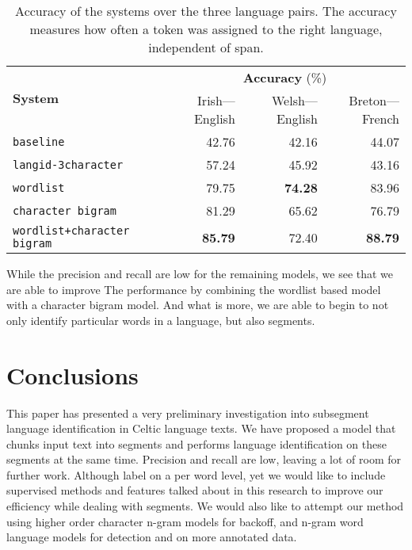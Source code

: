 \documentclass[11pt]{article}
\begin{document}
\begin{table}
\begin{center}
\begin{tabular}{|l|r|r|r|}
\hline
\multirow{2}{*}{\textbf{System}} &  \multicolumn{3}{c|}{\textbf{Accuracy} (\%)} \\\cline{2-4}
       &   Irish---English & Welsh---English & Breton---French \\ 
\hline
\texttt{baseline} & 42.76 & 42.16 & 44.07 \\
\hline
\texttt{langid-3character} & 57.24 & 45.92 & 43.16 \\
\hline
\texttt{wordlist} & 79.75 & \textbf{74.28} & 83.96 \\
\hline
\texttt{character bigram} & 81.29 & 65.62 & 76.79 \\
\hline
\texttt{wordlist+character bigram} & \textbf{85.79} & 72.40 & \textbf{88.79} \\
\hline
\end{tabular}
\end{center}
\vspace{-0.4cm}
\caption{Accuracy of the systems over the three language pairs. The accuracy measures how often a token
  was assigned to the right language, independent of span.}
\label{table:accuracy}
\end{table}
While the precision and recall are low for the remaining models, we see that we are able to improve 
The performance by combining the wordlist based model with a character bigram model. And what is more, we are able to begin to not only 
identify particular words in a language, but also segments.

\vspace{-0.132cm}
\section{Conclusions}
\vspace{-0.132cm}
\label{sec:conclusions}

This paper has presented a very preliminary investigation into subsegment language identification in Celtic language texts. We have
proposed a model that chunks input text into segments and performs language identification on these segments at the same time. Precision and
recall are low, leaving a lot of room for further work.
 Although  label on a per word level, yet we would like to include supervised methods and features talked about in this research to improve our efficiency while dealing with segments. We would also like to attempt our method using higher order character n-gram models for backoff, and n-gram word language models for detection and on more annotated data. 
\end{document}
